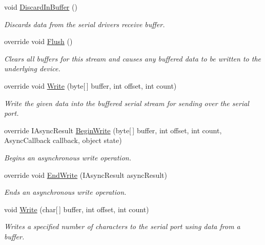 \begin{DoxyCompactItemize}
void \mbox{\hyperlink{class_r_j_c_p_1_1_i_o_1_1_ports_1_1_serial_port_stream_ada46a03b060dbdf15e8f6f4bf8f8fc73}{Discard\+In\+Buffer}} ()
\begin{DoxyCompactList}\small\item\em Discards data from the serial driver\textquotesingle{}s receive buffer. \end{DoxyCompactList}\item 
override void \mbox{\hyperlink{class_r_j_c_p_1_1_i_o_1_1_ports_1_1_serial_port_stream_aa748156919e799bfe594e2236ea9ede8}{Flush}} ()
\begin{DoxyCompactList}\small\item\em Clears all buffers for this stream and causes any buffered data to be written to the underlying device. \end{DoxyCompactList}\item 
override void \mbox{\hyperlink{class_r_j_c_p_1_1_i_o_1_1_ports_1_1_serial_port_stream_aaaddc4912c26c63caf8606410daadeb7}{Write}} (byte\mbox{[}$\,$\mbox{]} buffer, int offset, int count)
\begin{DoxyCompactList}\small\item\em Write the given data into the buffered serial stream for sending over the serial port. \end{DoxyCompactList}\item 
override I\+Async\+Result \mbox{\hyperlink{class_r_j_c_p_1_1_i_o_1_1_ports_1_1_serial_port_stream_abdfcddd53c974f894c47d0e02069c61a}{Begin\+Write}} (byte\mbox{[}$\,$\mbox{]} buffer, int offset, int count, Async\+Callback callback, object state)
\begin{DoxyCompactList}\small\item\em Begins an asynchronous write operation. \end{DoxyCompactList}\item 
override void \mbox{\hyperlink{class_r_j_c_p_1_1_i_o_1_1_ports_1_1_serial_port_stream_a525d2f47eee10aac5295cc7b9066e6de}{End\+Write}} (I\+Async\+Result async\+Result)
\begin{DoxyCompactList}\small\item\em Ends an asynchronous write operation. \end{DoxyCompactList}\item 
void \mbox{\hyperlink{class_r_j_c_p_1_1_i_o_1_1_ports_1_1_serial_port_stream_a21ac6501b27d48ca4e8e0405b29d9214}{Write}} (char\mbox{[}$\,$\mbox{]} buffer, int offset, int count)
\begin{DoxyCompactList}\small\item\em Writes a specified number of characters to the serial port using data from a buffer. \end{DoxyCompactList}\item 

\end{DoxyCompactItemize}
